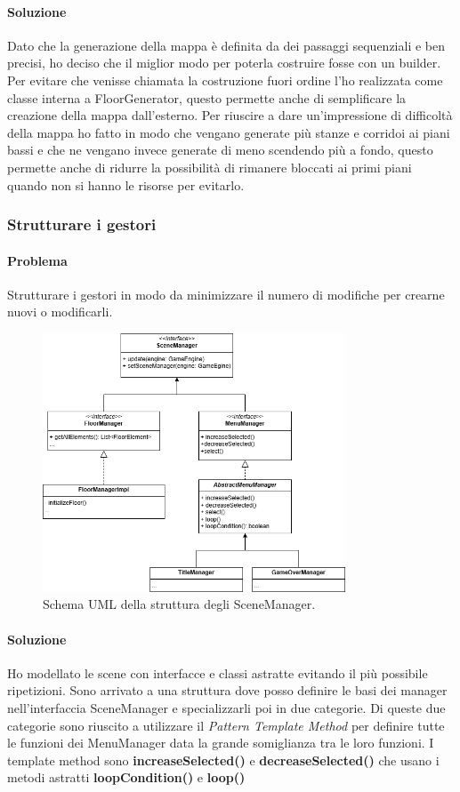 \documentclass{report}
\begin{document}
\paragraph{Soluzione} Dato che la generazione della mappa è definita da dei passaggi sequenziali e ben precisi, ho deciso che il miglior modo per poterla costruire fosse con un builder.
%
Per evitare che venisse chiamata la costruzione fuori ordine l’ho realizzata come classe interna a FloorGenerator, questo permette anche di semplificare la creazione della mappa dall’esterno.
%
Per riuscire a dare un'impressione di difficoltà della mappa ho fatto in modo che vengano generate più stanze e corridoi ai piani bassi e che ne vengano invece generate di meno scendendo più a fondo, 
%
questo permette anche di ridurre la possibilità di rimanere bloccati ai primi piani quando non si hanno le risorse per evitarlo.

\clearpage
\subsubsection{Strutturare i gestori}

\paragraph{Problema} Strutturare i gestori in modo da minimizzare il numero di modifiche per crearne nuovi o modificarli.

\begin{figure}[H]
    \centering
    \includegraphics[width=9cm]{SceneStructureDiagram.png}
    \caption{Schema UML della struttura degli SceneManager.}
    \label{img:SceneStructure}
\end{figure}

\paragraph{Soluzione} Ho modellato le scene con interfacce e classi astratte evitando il più possibile ripetizioni.
%
Sono arrivato a una struttura dove posso definire le basi dei manager nell'interfaccia SceneManager e specializzarli poi in due categorie.
%
Di queste due categorie sono riuscito a utilizzare il \textit{Pattern Template Method} per definire tutte le funzioni dei MenuManager data la grande somiglianza tra le loro funzioni.
%
I template method sono \textbf{increaseSelected()} e \textbf{decreaseSelected()} che usano i metodi astratti \textbf{loopCondition()} e \textbf{loop()}
\end{document}
